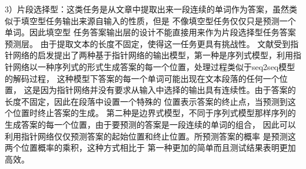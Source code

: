 3）片段选择型：这类任务是从文章中提取出来一段连续的单词作为答案，虽然类似于填空型任务输出来源自输入的性质，但是
不像填空型任务仅仅只是预测一个单词。因此填空型
任务答案输出层的设计不能直接用来作为片段选择型任务答案预测层。
由于提取文本的长度不固定，使得这一任务更具有挑战性。
文献\cite{MatchLSTM}受到指针网络的启发提出了两种基于指针网络的输出模型，第一种是序列式模型，利用指针网络以一种序列式的形式生成答案的每一个位置，处理过程类似于seq2seq模型的解码过程，
这种模型下答案的每一个单词可能出现在文本段落的任何一个位置，
这是因为指针网络并没有要求从输入中选择的输出具有连续性。由于答案的长度不固定，因此在段落中设置一个特殊的
位置表示答案的终止点，当预测到这个位置时终止答案的生成。
第二种是边界式模型，不同于序列式模型那样序列的生成答案的每一个位置，由于要预测的答案是一段连续的单词的组合，
因此可以利用指针网络仅仅预测答案的起始位置和终止位置。所预测答案的概率
是预测这两个位置概率的乘积，这种方式相比于
第一种更加的简单而且测试结果表明更加高效。

